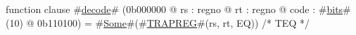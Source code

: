 function clause #\hyperref[zdecode]{decode}# (0b000000 @ rs : regno @ rt : regno @ code : #\hyperref[zbits]{bits}#(10) @ 0b110100) =
  #\hyperref[zSome]{Some}#(#\hyperref[zTRAPREG]{TRAPREG}#(rs, rt, EQ)) /* TEQ */
